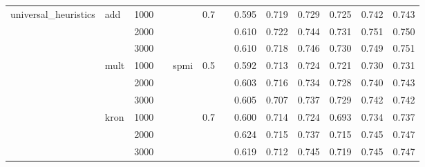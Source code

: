 \begin{tabular}{lllllllrrrrrr}
universal\_heuristics & add & 1000 &   &      & 0.7 &   &        0.595 &         0.719 &           0.729 &            0.725 &             0.742 &       0.743 \\
       & {} & 2000 &   &      &     &   &        0.610 &         0.722 &           0.744 &            0.731 &             0.751 &       0.750 \\
       & {} & 3000 &   &      &     &   &        0.610 &         0.718 &           0.746 &            0.730 &             0.749 &       0.751 \\
       & mult & 1000 &   & spmi & 0.5 &   &        0.592 &         0.713 &           0.724 &            0.721 &             0.730 &       0.731 \\
       & {} & 2000 &   &      &     &   &        0.603 &         0.716 &           0.734 &            0.728 &             0.740 &       0.743 \\
       & {} & 3000 &   &      &     &   &        0.605 &         0.707 &           0.737 &            0.729 &             0.742 &       0.742 \\
       & kron & 1000 &   &      & 0.7 &   &        0.600 &         0.714 &           0.724 &            0.693 &             0.734 &       0.737 \\
       & {} & 2000 &   &      &     &   &        0.624 &         0.715 &           0.737 &            0.715 &             0.745 &       0.747 \\
       & {} & 3000 &   &      &     &   &        0.619 &         0.712 &           0.745 &            0.719 &             0.745 &       0.747 \\
\bottomrule
\end{tabular}
